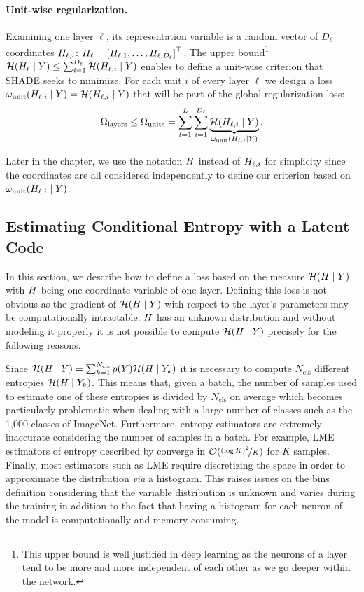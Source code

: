 \paragraph{Unit-wise regularization.} Examining one layer $\ell$, its representation variable is a random vector of $D_\ell$ coordinates $H_{\ell,i}$: $H_\ell = \left[H_{\ell,1}, \ldots, H_{\ell, D_\ell}\right]^\top$. The upper bound\footnote{This upper bound is well justified in deep learning as the neurons of a layer tend to be more and more independent of each other as we go deeper within the network.} $\mathcal{H}(H_\ell \mid Y) \le \sum_{i=1}^{D_\ell} \mathcal{H}(H_{\ell,i} \mid Y)$ enables to define a unit-wise criterion that \ac{SHADE} seeks to minimize. For each unit $i$ of every layer $\ell$ we design a loss $\omega_{\mathrm{unit}}(H_{\ell,i} \mid Y)=\mathcal{H}(H_{\ell,i} \mid Y)$ that will be part of the global regularization loss:
    \begin{align}
    \label{shadeA:SHADE}
        \Omega_{\mathrm{layers}} \le \Omega_{\mathrm{units}} = \sum_{l=1}^L \sum_{i = 1}^{D_\ell} \underbrace{\mathcal{H}(H_{\ell,i} \mid Y)}_{\omega_{\mathrm{unit}}(H_{\ell,i}\mid Y)}.
    \end{align}

Later in the chapter, we use the notation $H$ instead of $H_{\ell,i}$ for simplicity since the coordinates are all considered independently to define our criterion based on $\omega_{\mathrm{unit}}(H_{\ell,i}\mid Y)$. 
    
\subsection{Estimating Conditional Entropy with a Latent Code}

    In this section, we describe how to define a loss based on the measure $\mathcal{H}(H\mid Y)$ with $H$ being one coordinate variable of one layer. Defining this loss is not obvious as the gradient of $\mathcal{H}(H\mid Y)$ with respect to the layer's parameters may be computationally intractable. $H$ has an unknown distribution and without modeling it properly it is not possible to compute $\mathcal{H}(H\mid Y)$ precisely for the following reasons.
     
    Since $\mathcal{H}(H\mid Y) = \sum_{k=1}^{N_\mathrm{cls}} p(Y)\mathcal{H}(H\mid Y_k)$ it is necessary to compute $N_\mathrm{cls}$ different entropies $\mathcal{H}(H\mid Y_k)$. This means that, given a batch, the number of samples used to estimate one of these entropies is divided by $N_\mathrm{cls}$ on average which becomes particularly problematic when dealing with a large number of classes such as the 1,000 classes of ImageNet. Furthermore, entropy estimators are extremely inaccurate considering the number of samples in a batch. For example, LME estimators of entropy described by \citet{entropyestimation} converge in $\mathcal{O}(\nicefrac{(\log K)^2}{K})$ for $K$ samples. Finally, most estimators such as LME require discretizing the space in order to approximate the distribution \textit{via} a histogram. This raises issues on the bins definition considering that the variable distribution is unknown and varies during the training in addition to the fact that having a histogram for each neuron of the model is computationally and memory consuming.
    
